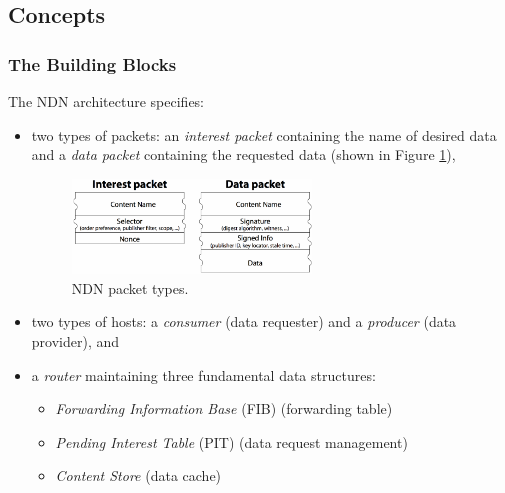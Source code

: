         \subsection{Concepts}

            \subsubsection{The Building Blocks}

                The NDN architecture specifies:
                    \begin{itemize}
                        \item two types of packets: an \emph{interest packet} containing the name of desired data and a \emph{data packet} containing the requested data (shown in Figure \ref{fig:ndn-packets}),
                        \begin{figure}[H]
                            \begin{center}
                                \includegraphics[width=0.6\textwidth]{fig/archs_ndn-packets.pdf}
                              \caption{NDN packet types.}
                              \label{fig:ndn-packets}
                            \end{center}
                        \end{figure}
                        \item two types of hosts: a \emph{consumer} (data requester) and a \emph{producer} (data provider), and
                        \item a \emph{router} maintaining three fundamental data structures:
                        \begin{itemize}
                            \item \emph{Forwarding Information Base} (FIB) (forwarding table)
                            \item \emph{Pending Interest Table} (PIT) (data request management)
                            \item \emph{Content Store} (data cache)
                        \end{itemize}
                    \end{itemize}

